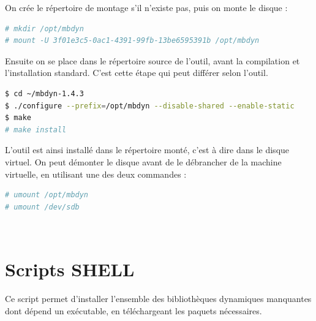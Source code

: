 On crée le répertoire de montage s'il n'existe pas, puis on monte le disque :
\begin{lstlisting}[language = sh]
# mkdir /opt/mbdyn
# mount -U 3f01e3c5-0ac1-4391-99fb-13be6595391b /opt/mbdyn
\end{lstlisting}

Ensuite on se place dans le répertoire source de l'outil, avant la compilation et l'installation standard.
C'est cette étape qui peut différer selon l'outil.
\begin{lstlisting}[language = sh]
$ cd ~/mbdyn-1.4.3
$ ./configure --prefix=/opt/mbdyn --disable-shared --enable-static
$ make
# make install
\end{lstlisting}

L'outil est ainsi installé dans le répertoire monté, c'est à dire dans le disque virtuel.
On peut démonter le disque avant de le débrancher de la machine virtuelle, en utilisant une des deux commandes :
\begin{lstlisting}[language = sh]
# umount /opt/mbdyn
# umount /dev/sdb
\end{lstlisting}
~~\\






\section{Scripts SHELL}

Ce script permet d'installer l'ensemble des bibliothèques dynamiques manquantes dont dépend un exécutable, en téléchargeant les paquets nécessaires.
\\


